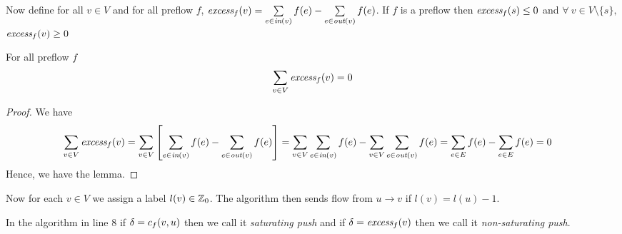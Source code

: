 Now define for all $v\in V$ and for all preflow $f$, $\emph{excess}_f(v)=\sum\limits_{e\in\emph{in}(v)}f(e)-\sum\limits_{e\in\emph{out}(v)}f(e)$. If $f$ is a preflow then $\emph{excess}_f(s)\leq 0$ and $\forall\ v\in V\setminus\{s\},$ $\emph{excess}_f(v)\geq 0$
\begin{lemma}{}{}
	For all preflow $f$ $$\sum\limits_{v\in V}\emph{excess}_f(v)=0$$
\end{lemma}
\begin{proof}We have
	\begin{align*}
		\sum\limits_{v\in V}\emph{excess}_f(v) & = \sum\limits_{v\in V}\left[ \sum\limits_{e\in\emph{in}(v)}f(e)-\sum\limits_{e\in\emph{out}(v)}f(e)\right] = \sum\limits_{v\in V}\sum\limits_{e\in\emph{in}(v)}f(e)-\sum\limits_{v\in V}\sum\limits_{e\in\emph{out}(v)}f(e) = \sum_{e\in E}f(e)-\sum_{e\in E}f(e)=0
	\end{align*}Hence, we have the lemma.
\end{proof}
Now for each $v\in V$ we assign a label $l(v)\in\mathbb{Z}_0$. The algorithm then sends flow from $u\to v$ if $l(v)=l(u)-1$.
\begin{center}
\end{center}
\begin{algorithm}
	\DontPrintSemicolon
	\caption{}
\end{algorithm}
In the algorithm in line 8 if $\delta=c_f(v,u)$ then we call it \emph{saturating push} and if $\delta=\emph{excess}_f(v)$ then we call it \emph{non-saturating push}.

